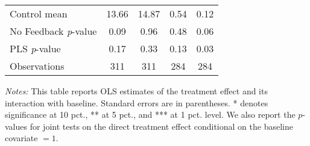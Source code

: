 \begin{table}[ht]
{\begin{threeparttable}
\begin{tabular}{l*{4}{c}}
Control mean    &    13.66         &    14.87         &     0.54         &     0.12         \\
No Feedback \emph{p}-value&     0.09         &     0.96         &     0.48         &     0.06         \\
PLS \emph{p}-value&     0.17         &     0.33         &     0.13         &     0.03         \\
Observations    &      311         &      311         &      284         &      284         \\
\bottomrule \end{tabular} \begin{tablenotes}[flushleft] \footnotesize \item \emph{Notes:} This table reports OLS estimates of the treatment effect and its interaction with baseline. Standard errors are in parentheses. * denotes significance at 10 pct., ** at 5 pct., and *** at 1 pct. level. We also report the \(p\)-values for joint tests on the direct treatment effect conditional on the baseline covariate $= 1$. \end{tablenotes} \end{threeparttable} } \end{table}


